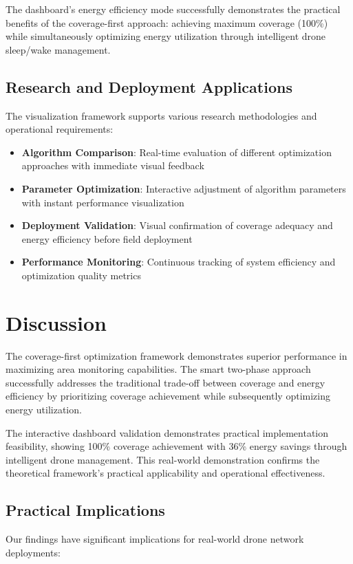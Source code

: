 \documentclass[conference]{IEEEtran}
\begin{document}
The dashboard's energy efficiency mode successfully demonstrates the practical benefits of the coverage-first approach: achieving maximum coverage (100\%) while simultaneously optimizing energy utilization through intelligent drone sleep/wake management.

\subsection{Research and Deployment Applications}

The visualization framework supports various research methodologies and operational requirements:

\begin{itemize}
\item \textbf{Algorithm Comparison}: Real-time evaluation of different optimization approaches with immediate visual feedback
\item \textbf{Parameter Optimization}: Interactive adjustment of algorithm parameters with instant performance visualization
\item \textbf{Deployment Validation}: Visual confirmation of coverage adequacy and energy efficiency before field deployment
\item \textbf{Performance Monitoring}: Continuous tracking of system efficiency and optimization quality metrics
\end{itemize}

\section{Discussion}

The coverage-first optimization framework demonstrates superior performance in maximizing area monitoring capabilities. The smart two-phase approach successfully addresses the traditional trade-off between coverage and energy efficiency by prioritizing coverage achievement while subsequently optimizing energy utilization.

The interactive dashboard validation demonstrates practical implementation feasibility, showing 100\% coverage achievement with 36\% energy savings through intelligent drone management. This real-world demonstration confirms the theoretical framework's practical applicability and operational effectiveness.

\subsection{Practical Implications}
Our findings have significant implications for real-world drone network deployments:
\end{document}
